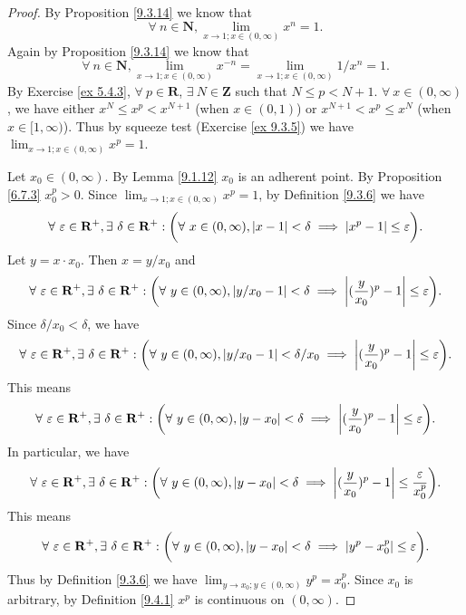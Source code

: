 \begin{proof}
    By Proposition \ref{9.3.14} we know that
    \[
        \forall\ n \in \mathbf{N}, \lim_{x \to 1 ; x \in (0, \infty)} x^n = 1.
    \]
    Again by Proposition \ref{9.3.14} we know that
    \[
        \forall\ n \in \mathbf{N}, \lim_{x \to 1 ; x \in (0, \infty)} x^{-n} = \lim_{x \to 1 ; x \in (0, \infty)} 1 / x^n = 1.
    \]
    By Exercise \ref{ex 5.4.3}, \(\forall\ p \in \mathbf{R}\), \(\exists\ N \in \mathbf{Z}\) such that \(N \leq p < N + 1\).
    \(\forall\ x \in (0, \infty)\), we have either \(x^N \leq x^p < x^{N + 1}\) (when \(x \in (0, 1)\)) or \(x^{N + 1} < x^p \leq x^{N}\) (when \(x \in [1, \infty)\)).
    Thus by squeeze test (Exercise \ref{ex 9.3.5}) we have \(\lim_{x \to 1 ; x \in (0, \infty)} x^p = 1\).

    Let \(x_0 \in (0, \infty)\).
    By Lemma \ref{9.1.12} \(x_0\) is an adherent point.
    By Proposition \ref{6.7.3} \(x_0^p > 0\).
    Since \(\lim_{x \to 1 ; x \in (0, \infty)} x^p = 1\), by Definition \ref{9.3.6} we have
    \[
        \forall\ \varepsilon \in \mathbf{R}^+, \exists\ \delta \in \mathbf{R}^+ : \bigg(\forall\ x \in (0, \infty), \abs*{x - 1} < \delta \implies \abs*{x^p - 1} \leq \varepsilon\bigg).
    \]
    Let \(y = x \cdot x_0\).
    Then \(x = y / x_0\) and
    \[
        \forall\ \varepsilon \in \mathbf{R}^+, \exists\ \delta \in \mathbf{R}^+ : \bigg(\forall\ y \in (0, \infty), \abs*{y / x_0 - 1} < \delta \implies \abs*{(\frac{y}{x_0})^p - 1} \leq \varepsilon\bigg).
    \]
    Since \(\delta / x_0 < \delta\), we have
    \[
        \forall\ \varepsilon \in \mathbf{R}^+, \exists\ \delta \in \mathbf{R}^+ : \bigg(\forall\ y \in (0, \infty), \abs*{y / x_0 - 1} < \delta / x_0 \implies \abs*{(\frac{y}{x_0})^p - 1} \leq \varepsilon\bigg).
    \]
    This means
    \[
        \forall\ \varepsilon \in \mathbf{R}^+, \exists\ \delta \in \mathbf{R}^+ : \bigg(\forall\ y \in (0, \infty), \abs*{y - x_0} < \delta \implies \abs*{(\frac{y}{x_0})^p - 1} \leq \varepsilon\bigg).
    \]
    In particular, we have
    \[
        \forall\ \varepsilon \in \mathbf{R}^+, \exists\ \delta \in \mathbf{R}^+ : \bigg(\forall\ y \in (0, \infty), \abs*{y - x_0} < \delta \implies \abs*{(\frac{y}{x_0})^p - 1} \leq \frac{\varepsilon}{x_0^p}\bigg).
    \]
    This means
    \[
        \forall\ \varepsilon \in \mathbf{R}^+, \exists\ \delta \in \mathbf{R}^+ : \bigg(\forall\ y \in (0, \infty), \abs*{y - x_0} < \delta \implies \abs*{y^p - x_0^p} \leq \varepsilon\bigg).
    \]
    Thus by Definition \ref{9.3.6} we have \(\lim_{y \to x_0 ; y \in (0, \infty)} y^p = x_0^p\).
    Since \(x_0\) is arbitrary, by Definition \ref{9.4.1} \(x^p\) is continuous on \((0, \infty)\).
\end{proof}

